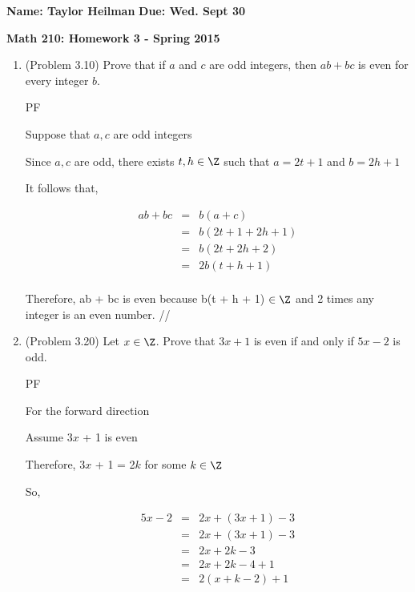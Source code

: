 \documentclass[12pt]{article}
\begin{document}
\textbf{Name: Taylor Heilman}    \hspace{4in} \textbf{Due: Wed. Sept 30}
\begin{center} \textbf{Math 210: Homework 3 - Spring 2015} \end{center}

\begin{enumerate}

\item (Problem 3.10) Prove that if $a$ and $c$ are odd integers, then $ab + bc$ is even for every integer $b$.

{PF

Suppose that $a,c$ are odd integers

Since $a, c$ are odd, there exists $t, h \in \Z$ such that
	$a = 2t +1$ and $b = 2h + 1$
	
It follows that, 




\begin{eqnarray}
ab + bc & = & b(a+c) \nonumber \\
~ & = & b(2t + 1 + 2h + 1)\nonumber  \\
~ & = & b(2t + 2h + 2)\nonumber \\
~ & = & 2b(t + h + 1) \nonumber \\
\end{eqnarray}


Therefore, 
ab + bc is even because b(t + h + 1) $\in \Z$  and 2 times any integer is an even number.
//
 }


\item (Problem 3.20) Let $x \in \Z$.  Prove that $3x + 1$ is even if and only if $5x - 2$ is odd.

{PF

For the forward direction

Assume 3$x$ + 1 is even

Therefore, 3$x$ + 1 = 2$k$ for some $k \in \Z$

So,

\begin{eqnarray}  5x - 2 &= & 2x + (3x + 1) - 3    \nonumber \\
~ & = &  2x + (3x + 1) - 3\nonumber  \\
~ & = &  2x + 2k - 3 \nonumber \\
~ & = &2x + 2k - 4 + 1  \nonumber \\
~ & =& 2(x + k - 2) + 1 \nonumber \\
\end{eqnarray}




}
\end{enumerate}
\end{document}

